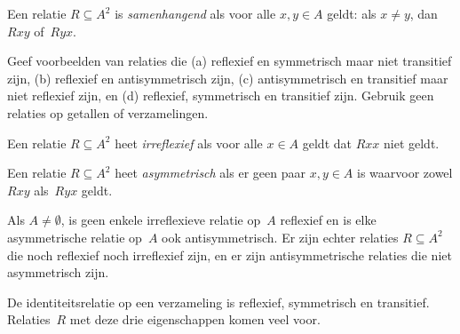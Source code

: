 \documentclass[openany]{memoir}
\begin{document}
\begin{defn}[Samenhangendheid]
Een relatie $R \subseteq A^2$ is \emph{samenhangend} als voor alle
$x,y\in A$ geldt: als $x \neq y$, dan $Rxy$ of~$Ryx$.
\end{defn}

\begin{prob}
Geef voorbeelden van relaties die (a) reflexief en symmetrisch maar
niet transitief zijn, (b) reflexief en antisymmetrisch zijn, (c)
antisymmetrisch en transitief maar niet reflexief zijn, en (d)
reflexief, symmetrisch en transitief zijn. Gebruik geen relaties op
getallen of verzamelingen.
\end{prob} 
 
\begin{defn}[Irreflexiviteit]
Een relatie $R \subseteq A^2$ heet \emph{irreflexief} als voor alle
$x \in A$ geldt dat $Rxx$ niet geldt.
\end{defn}

\begin{defn}[Asymmetrie]
Een relatie $R \subseteq A^2$ heet \emph{asymmetrisch} als er geen paar
$x,y\in A$ is waarvoor zowel $Rxy$ als~$Ryx$ geldt.
\end{defn}

Als $A \neq \emptyset$, is geen enkele irreflexieve relatie op~$A$
reflexief en is elke asymmetrische relatie op~$A$ ook
antisymmetrisch. Er zijn echter relaties $R \subseteq A^2$ die noch
reflexief noch irreflexief zijn, en er zijn antisymmetrische relaties
die niet asymmetrisch zijn.
\endgroup

\begingroup
\def\olfilename{OLP-0015}
\def\olfilepath{content/sets-functions-relations/relations/}
\hypertarget{unit-OLP-0015}{}





De identiteitsrelatie op een verzameling is reflexief, symmetrisch en
transitief. Relaties~$R$ met deze drie eigenschappen komen veel voor.
\end{document}
